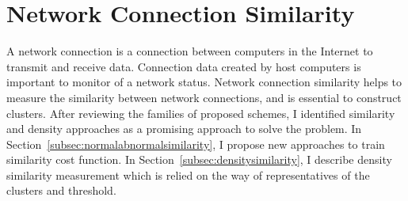 \section{Network Connection Similarity}
\label{sec:connectionsimilarity}
A network connection is a connection between computers in the Internet to transmit and receive data. 
Connection data created by host computers is important to monitor of a network status.
Network connection similarity helps to measure the similarity between network connections, and is essential to construct clusters. 
After reviewing the families of proposed schemes, I identified similarity and density approaches as a promising approach to solve the problem.
\newline
In Section~\ref{subsec:normalabnormalsimilarity}, I propose new approaches to train similarity cost function.\newline
In Section~\ref{subsec:densitysimilarity}, I describe density similarity measurement which is relied on the way of representatives of the clusters and threshold.\newline
%
